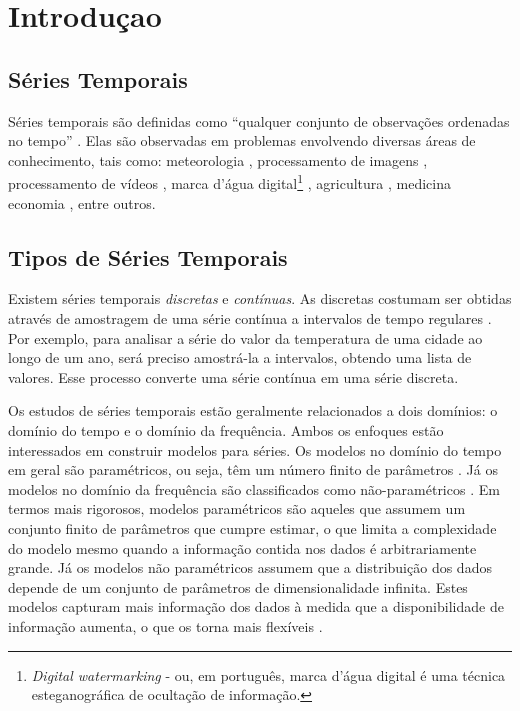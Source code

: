 \section{Introduçao}

 \subsection{Séries Temporais}
 \label{sec:SeriesTemporais}
Séries temporais são definidas como ``qualquer conjunto de observações ordenadas no tempo'' \cite{morettin2006analise}. Elas são observadas em problemas envolvendo diversas áreas de conhecimento, tais como: meteorologia \cite{7982030}, processamento de imagens \cite{7729869,7164182, 6723283}, processamento de vídeos \cite{6469509}, marca d'água digital\footnote{\textit{Digital watermarking} - ou, em português, marca d'água digital é uma técnica esteganográfica de ocultação de informação.} \cite{7024611}, agricultura \cite{6723610}, medicina \cite{6707296} economia \cite{4810671}, entre outros.
 
 \subsection{Tipos de Séries Temporais}
 Existem séries temporais \textit{discretas} e \textit{contínuas}. As discretas costumam ser obtidas através de amostragem de uma série contínua a intervalos de tempo regulares \cite{morettin2006analise,hyndman2018forecasting}. Por exemplo, para analisar a série do valor da temperatura de uma cidade ao longo de um ano, será preciso amostrá-la a intervalos, obtendo uma lista de valores. Esse processo converte uma série contínua em uma série discreta.

Os estudos de séries temporais estão geralmente relacionados a dois domínios: o domínio do tempo e o domínio da frequência. Ambos os enfoques estão interessados em construir modelos para séries. Os modelos no domínio do tempo em geral são paramétricos, ou seja, têm um número finito de parâmetros \cite{conover1981rank}. Já os modelos no domínio da frequência são classificados como não-paramétricos \cite{hollander1999nonparametric}. Em termos mais rigorosos, modelos paramétricos são aqueles que assumem um conjunto finito de parâmetros que cumpre estimar, o que limita a complexidade do modelo mesmo quando a informação contida nos dados é arbitrariamente grande. Já os modelos não paramétricos assumem que a distribuição dos dados depende de um conjunto de parâmetros de dimensionalidade infinita. Estes modelos capturam mais informação dos dados à medida que a disponibilidade de informação aumenta, o que os torna mais flexíveis \cite{ChenNeural2001}.
 
